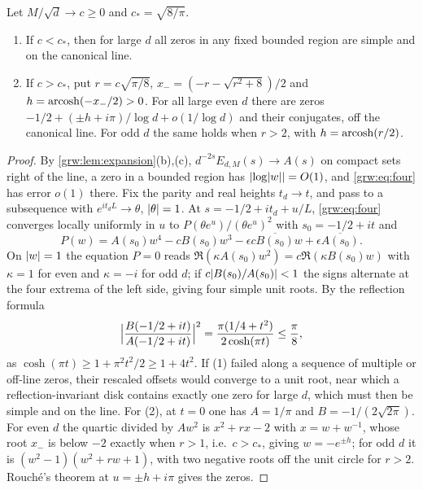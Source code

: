 \begin{theorem}\label{grw:thm:critical}
Let $M/\sqrt d\to c\ge0$ and $c_*=\sqrt{8/\pi}$.
\begin{enumerate}[label=\textup{(\arabic*)}]
\item If $c<c_*$, then for large $d$ all zeros in any fixed bounded region
are simple and on the canonical line.
\item If $c>c_*$, put $r=c\sqrt{\pi/8}$, $x_-=(-r-\sqrt{r^2+8})/2$ and
$h=\operatorname{arcosh}(-x_-/2)>0$. For all large even $d$ there are zeros
$-1/2+(\pm h+i\pi)/\log d+o(1/\log d)$ and their conjugates, off the
canonical line. For odd $d$ the same holds when $r>2$, with
$h=\operatorname{arcosh}(r/2)$.
\end{enumerate}
\end{theorem}

\begin{proof}
By \cref{grw:lem:expansion}(b),(c), $d^{-2s}E_{d,M}(s)\to A(s)$ on compact
sets right of the line, a zero in a bounded region has $\lvert\log\lvert w\rvert\rvert=O(1)$,
and \eqref{grw:eq:four} has error $o(1)$ there. Fix the parity and real
heights $t_d\to t$, and pass to a subsequence with $e^{it_dL}\to\theta$,
$\lvert\theta\rvert=1$. At $s=-1/2+it_d+u/L$, \eqref{grw:eq:four} converges locally
uniformly in $u$ to $P(\theta e^u)/(\theta e^u)^2$ with $s_0=-1/2+it$ and
\begin{equation}\label{grw:eq:quartic}
 P(w)=A(s_0)w^4-cB(s_0)w^3-\epsilon c\overline{B(s_0)}w+\epsilon\overline{A(s_0)}.
\end{equation}
On $\lvert w\rvert=1$ the equation $P=0$ reads $\Re(\kappa A(s_0)w^2)=
c\Re(\kappa B(s_0)w)$ with $\kappa=1$ for even and $\kappa=-i$ for odd $d$;
if $c\lvert B(s_0)/A(s_0)\rvert<1$ the signs alternate at the four extrema of the
left side, giving four simple unit roots. By the reflection formula
\[
 \Bigl\lvert\frac{B(-1/2+it)}{A(-1/2+it)}\Bigr\rvert^2=\frac{\pi(1/4+t^2)}{2\cosh(\pi t)}\le\frac\pi8,
\]
as $\cosh(\pi t)\ge1+\pi^2t^2/2\ge1+4t^2$. If (1) failed along a sequence of
multiple or off-line zeros, their rescaled offsets would converge to a unit
root, near which a reflection-invariant disk contains exactly one zero for
large $d$, which must then be simple and on the line. For (2), at $t=0$ one
has $A=1/\pi$ and $B=-1/(2\sqrt{2\pi})$. For even $d$ the quartic divided by
$Aw^2$ is $x^2+rx-2$ with $x=w+w^{-1}$, whose root $x_-$ is below $-2$
exactly when $r>1$, i.e.\ $c>c_*$, giving $w=-e^{\pm h}$; for odd $d$ it is
$(w^2-1)(w^2+rw+1)$, with two negative roots off the unit circle for $r>2$.
Rouch\'e's theorem at $u=\pm h+i\pi$ gives the zeros.
\end{proof}

